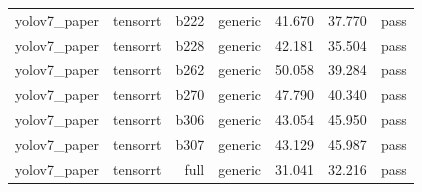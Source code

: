 \begin{table}[t]
\begin{tabular}{lrrrrrr}
yolov7\_paper & tensorrt & b222 & generic & 41.670 & 37.770 & pass \\
yolov7\_paper & tensorrt & b228 & generic & 42.181 & 35.504 & pass \\
yolov7\_paper & tensorrt & b262 & generic & 50.058 & 39.284 & pass \\
yolov7\_paper & tensorrt & b270 & generic & 47.790 & 40.340 & pass \\
yolov7\_paper & tensorrt & b306 & generic & 43.054 & 45.950 & pass \\
yolov7\_paper & tensorrt & b307 & generic & 43.129 & 45.987 & pass \\
yolov7\_paper & tensorrt & full & generic & 31.041 & 32.216 & pass \\
\bottomrule
\end{tabular}
\end{table}
